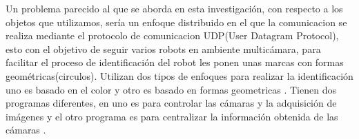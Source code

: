 \documentclass[conference]{IEEEtran}
\begin{document}
Un problema parecido al que se aborda en esta investigaci\'on, con respecto a los objetos que utilizamos, ser\'ia un enfoque distribuido en el que la comunicacion se realiza mediante el protocolo de comunicacion UDP(User Datagram Protocol), esto con el objetivo de seguir varios robots en ambiente multic\'amara, para facilitar el proceso de identificaci\'on del robot les ponen unas marcas con formas geom\'etricas(circulos). Utilizan dos tipos de enfoques para realizar la identificaci\'on uno es basado en el color y otro es basado en formas geometricas . Tienen dos programas diferentes, en uno es para controlar las c\'amaras y la adquisici\'on de im\'agenes y el otro programa es para centralizar la informaci\'on obtenida de las c\'amaras \cite{garcia_mot}. \\



%
%



%
%
\end{document}
